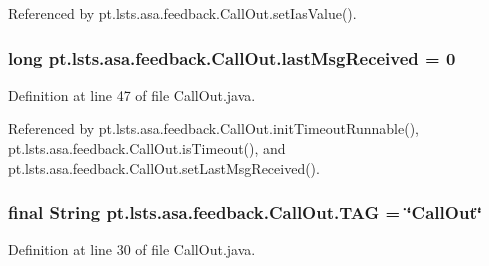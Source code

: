 Referenced by pt.\+lsts.\+asa.\+feedback.\+Call\+Out.\+set\+Ias\+Value().

\hypertarget{classpt_1_1lsts_1_1asa_1_1feedback_1_1CallOut_a5a64e34dcc12acad25b1a68f2eaa5e13}{}
\subsubsection[{last\+Msg\+Received}]{\setlength{\rightskip}{0pt plus 5cm}long pt.\+lsts.\+asa.\+feedback.\+Call\+Out.\+last\+Msg\+Received = 0\hspace{0.3cm}{\ttfamily [private]}}\label{classpt_1_1lsts_1_1asa_1_1feedback_1_1CallOut_a5a64e34dcc12acad25b1a68f2eaa5e13}


Definition at line 47 of file Call\+Out.\+java.



Referenced by pt.\+lsts.\+asa.\+feedback.\+Call\+Out.\+init\+Timeout\+Runnable(), pt.\+lsts.\+asa.\+feedback.\+Call\+Out.\+is\+Timeout(), and pt.\+lsts.\+asa.\+feedback.\+Call\+Out.\+set\+Last\+Msg\+Received().

\hypertarget{classpt_1_1lsts_1_1asa_1_1feedback_1_1CallOut_aa75bdeac73953fe2c57dea3c8f0f0b73}{}
\subsubsection[{T\+A\+G}]{\setlength{\rightskip}{0pt plus 5cm}final String pt.\+lsts.\+asa.\+feedback.\+Call\+Out.\+T\+A\+G = \char`\"{}Call\+Out\char`\"{}\hspace{0.3cm}{\ttfamily [private]}}\label{classpt_1_1lsts_1_1asa_1_1feedback_1_1CallOut_aa75bdeac73953fe2c57dea3c8f0f0b73}


Definition at line 30 of file Call\+Out.\+java.

\hypertarget{classpt_1_1lsts_1_1asa_1_1feedback_1_1CallOut_ab9d2ddff0dddef8a356da30528da4f1e}{}
